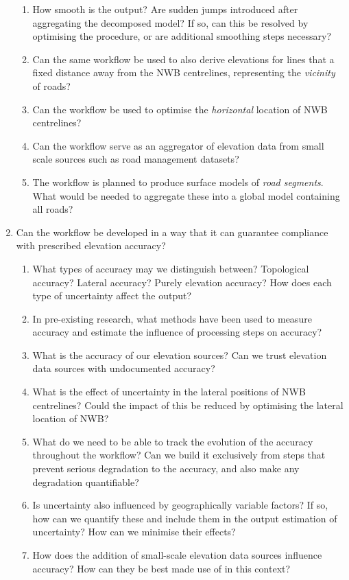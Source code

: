\begin{enumerate}
\begin{enumerate}
        \item How smooth is the output? Are sudden jumps introduced after aggregating the decomposed model? If so, can this be resolved by optimising the procedure, or are additional smoothing steps necessary?
        \item Can the same workflow be used to also derive elevations for lines that a fixed distance away from the NWB centrelines, representing the \textit{vicinity} of roads?
        \item Can the workflow be used to optimise the \textit{horizontal} location of NWB centrelines?
        \item Can the workflow serve as an aggregator of elevation data from small scale sources such as road management datasets?
        \item The workflow is planned to produce surface models of \textit{road segments}. What would be needed to aggregate these into a global model containing all roads?
    \end{enumerate}
    \item Can the workflow be developed in a way that it can guarantee compliance with prescribed elevation accuracy?
    \begin{enumerate}
        \item What types of accuracy may we distinguish between? Topological accuracy? Lateral accuracy? Purely elevation accuracy? How does each type of uncertainty affect the output?
        \item In pre-existing research, what methods have been used to measure accuracy and estimate the influence of processing steps on accuracy?
        \item What is the accuracy of our elevation sources? Can we trust elevation data sources with undocumented accuracy?
        \item What is the effect of uncertainty in the lateral positions of NWB centrelines? Could the impact of this be reduced by optimising the lateral location of NWB?
        \item What do we need to be able to track the evolution of the accuracy throughout the workflow? Can we build it exclusively from steps that prevent serious degradation to the accuracy, and also make any degradation quantifiable?
        \item Is uncertainty also influenced by geographically variable factors? If so, how can we quantify these and include them in the output estimation of uncertainty? How can we minimise their effects?
        \item How does the addition of small-scale elevation data sources influence accuracy? How can they be best made use of in this context?

\end{enumerate}
\end{enumerate}
